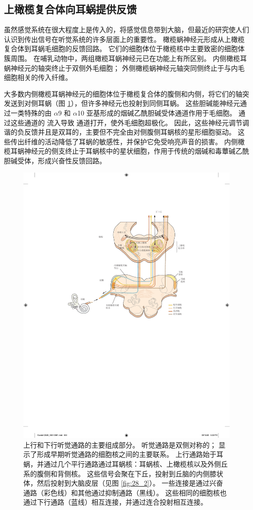 \subsection{上橄榄复合体向耳蜗提供反馈}

虽然感觉系统在很大程度上是传入的，将感觉信息带到大脑，但最近的研究使人们认识到传出信号在听觉系统的许多层面上的重要性。
橄榄蜗神经元形成从上橄榄复合体到耳蜗毛细胞的反馈回路。
它们的细胞体位于橄榄核中主要致密的细胞体簇周围。
在哺乳动物中，两组橄榄耳蜗神经元已在功能上有所区别。
内侧橄榄耳蜗神经元的轴突终止于双侧外毛细胞；
外侧橄榄蜗神经元轴突同侧终止于与内毛细胞相关的传入纤维。


大多数内侧橄榄耳蜗神经元的细胞体位于橄榄复合体的腹侧和内侧，将它们的轴突发送到对侧耳蜗（图 \ref{fig:28_7}），但许多神经元也投射到同侧耳蜗。
这些胆碱能神经元通过一类特殊的由 $\alpha$9 和 $\alpha$10 亚基形成的烟碱乙酰胆碱受体通道作用于毛细胞。
通过这些通道的  流入导致  通道打开，使外毛细胞超极化。
因此，这些神经元调节调谐的负反馈并且是双耳的，主要但不完全由对侧腹侧耳蜗核的星形细胞驱动。
这些传出纤维的活动降低了耳蜗的敏感性，并保护它免受响亮声音的损害。
内侧橄榄耳蜗神经元的侧支终止于耳蜗核中的星状细胞，作用于传统的烟碱和毒蕈碱乙酰胆碱受体，形成兴奋性反馈回路。


\begin{figure}[htbp]
	\centering
	\includegraphics[width=0.8\linewidth]{chap28/fig_28_7}
	\caption{上行和下行听觉通路的主要组成部分。
		听觉通路是双侧对称的； 显示了形成早期听觉通路的细胞核之间的主要联系。
		上行通路始于耳蜗，并通过几个平行通路通过耳蜗核：耳蜗核、上橄榄核以及外侧丘系的腹侧和背侧核。
		这些信号会聚在下丘，投射到丘脑的内侧膝状体，然后投射到大脑皮层（见图 \ref{fig:28_2}）。
		一些连接是通过兴奋通路（彩色线）和其他通过抑制通路（黑线）。 
		这些相同的细胞核也通过下行通路（蓝线）相互连接，并通过连合投射相互连接。}
	\label{fig:28_7}
\end{figure}


